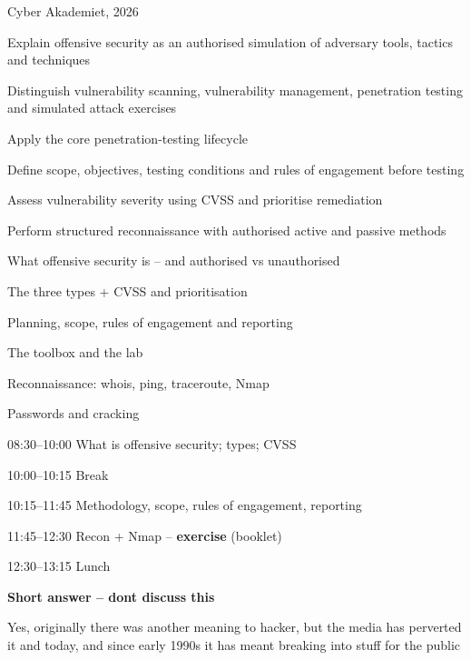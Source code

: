 \documentclass[Screen16to9,17pt]{foils}
\begin{document}
{Cyber Akademiet, 2026}

\begin{list2}
\item Explain offensive security as an authorised simulation of adversary tools, tactics and techniques
\item Distinguish vulnerability scanning, vulnerability management, penetration testing and simulated attack exercises
\item Apply the core penetration-testing lifecycle
\item Define scope, objectives, testing conditions and rules of engagement before testing
\item Assess vulnerability severity using CVSS and prioritise remediation
\item Perform structured reconnaissance with authorised active and passive methods
\end{list2}

\begin{list2}
\item What offensive security is -- and authorised vs unauthorised
\item The three types + CVSS and prioritisation
\item Planning, scope, rules of engagement and reporting
\item The toolbox and the lab
\item Reconnaissance: whois, ping, traceroute, Nmap
\item Passwords and cracking
\end{list2}

\begin{list2}
\item 08:30--10:00 What is offensive security; types; CVSS
\item 10:00--10:15 Break
\item 10:15--11:45 Methodology, scope, rules of engagement, reporting
\item 11:45--12:30 Recon + Nmap -- \textbf{exercise} (booklet)
\item 12:30--13:15 Lunch
\end{list2}


{\bfseries Short answer -- dont discuss this}

Yes, originally there was another meaning to hacker, but the media has perverted it and today, and since early 1990s it has meant breaking into stuff for the public
\end{document}
